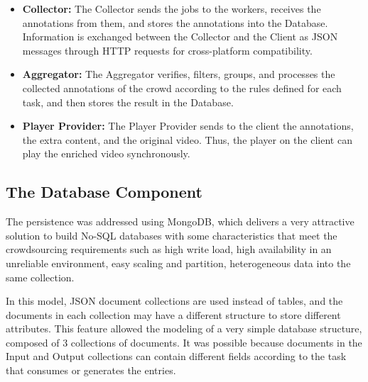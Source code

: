 

\begin{itemize}

\item \textbf{Collector: }The Collector sends the jobs to the workers, receives the annotations from them, and stores the annotations into the Database. Information is exchanged between the Collector and the Client as JSON messages through HTTP requests for cross-platform compatibility.

\item \textbf{Aggregator: }The Aggregator verifies, filters, groups, and processes the collected annotations of the crowd according to the rules defined for each task, and then stores the result in the Database.

\item \textbf{Player Provider: }The Player Provider sends to the client the annotations, the extra content, and the original video. Thus, the player on the client can play the enriched video synchronously.


\end{itemize}

\subsection{The Database Component}

The persistence was addressed using MongoDB, which delivers a very attractive solution to build No-SQL databases with some characteristics that meet the crowdsourcing requirements such as high write load, high availability in an unreliable environment, easy scaling and partition, heterogeneous data into the same collection.

In this model, JSON document collections are used instead of tables, and the documents in each collection may have a different structure to store different attributes. This feature allowed the modeling of a very simple database structure, composed of 3 collections of documents. It was possible because documents in the Input and Output collections can contain different fields according to the task that consumes or generates the entries.

